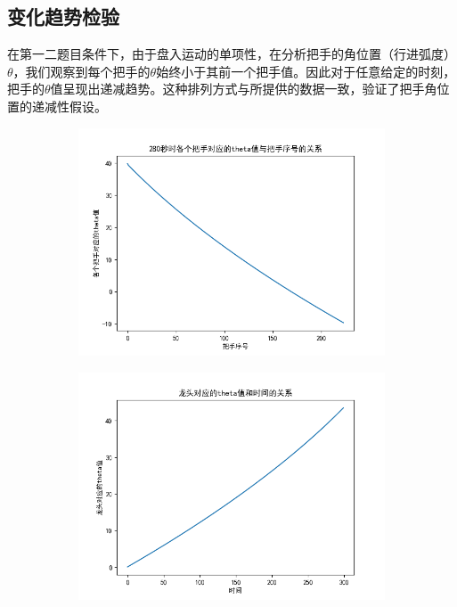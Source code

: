 \documentclass[withoutpreface,bwprint]{cumcmthesis}
\begin{document}
\subsection{变化趋势检验}
在第一二题目条件下，由于盘入运动的单项性，在分析把手的角位置（行进弧度）$\theta$，我们观察到每个把手的$\theta$始终小于其前一个把手值。因此对于任意给定的时刻，把手的$\theta$值呈现出递减趋势。这种排列方式与所提供的数据一致，验证了把手角位置的递减性假设。
\begin{figure}[htbp!]
	\centering
	\begin{subfigure}[t]{0.45\textwidth}
		\includegraphics[width=\textwidth]{pics/a1}
		\label{fig:a1}
	\end{subfigure}
	\hfill
	\begin{subfigure}[t]{0.45\textwidth}
		\includegraphics[width=\textwidth]{pics/b1}
		\label{fig:b1}
	\end{subfigure}
\end{figure}
\end{document}
